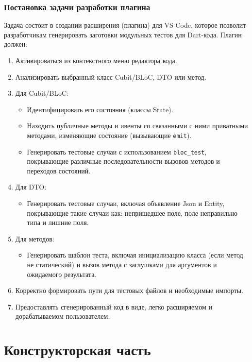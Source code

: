 \documentclass[14pt, russian]{scrartcl}
\begin{document}
\subsubsection{Постановка задачи разработки плагина}
Задача состоит в создании расширения (плагина) для VS Code, которое позволит разработчикам генерировать заготовки модульных тестов для Dart-кода. Плагин должен:
\begin{enumerate}
    \item Активироваться из контекстного меню редактора кода.
    \item Анализировать выбранный класс Cubit/BLoC, DTO или метод.
    \item Для Cubit/BLoC:
        \begin{itemize}
            \item Идентифицировать его состояния (классы State).
            \item Находить публичные методы и ивенты со связанными с ними приватными методами, изменяющие состояние (вызывающие \texttt{emit}).
            \item Генерировать тестовые случаи с использованием \texttt{bloc\_test}, покрывающие различные последовательности вызовов методов и переходов состояний.
        \end{itemize}
    \item Для DTO:
        \begin{itemize}
            \item Генерировать тестовые случаи, включая объявление Json и Entity, покрывающие такие случаи как: непришедшее поле, поле неправильно типа и лишние поля.
        \end{itemize}
    \item Для методов:
        \begin{itemize}
            \item Генерировать шаблон теста, включая инициализацию класса (если метод не статический) и вызов метода с заглушками для аргументов и ожидаемого результата.
        \end{itemize}
    \item Корректно формировать пути для тестовых файлов и необходимые импорты.
    \item Предоставлять сгенерированный код в виде, легко расширяемом и дорабатываемом пользователем.
\end{enumerate}

\section{Конструкторская часть}
\end{document}
